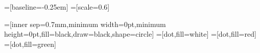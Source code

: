 =[baseline=-0.25em]
=[scale=0.6]

=[inner sep=0.7mm,minimum width=0pt,minimum height=0pt,fill=black,draw=black,shape=circle]
=[dot,fill=white]
=[dot,fill=red]
=[dot,fill=green]
